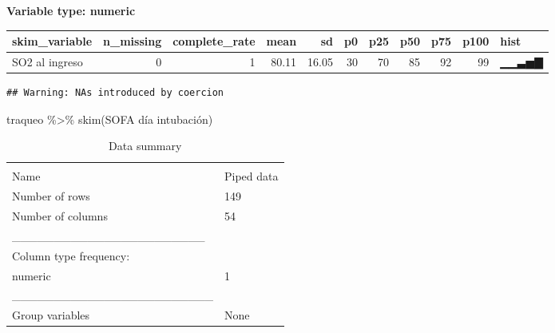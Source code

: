 \documentclass[
]{article}
\newenvironment{Shaded}{\begin{snugshade}}{\end{snugshade}}
\newcommand{\AttributeTok}[1]{\textcolor[rgb]{0.77,0.63,0.00}{#1}}
\newcommand{\DocumentationTok}[1]{\textcolor[rgb]{0.56,0.35,0.01}{\textbf{\textit{#1}}}}
\newcommand{\FunctionTok}[1]{\textcolor[rgb]{0.00,0.00,0.00}{#1}}
\newcommand{\NormalTok}[1]{#1}
\newcommand{\OtherTok}[1]{\textcolor[rgb]{0.56,0.35,0.01}{#1}}
\newcommand{\SpecialCharTok}[1]{\textcolor[rgb]{0.00,0.00,0.00}{#1}}
\newcommand{\StringTok}[1]{\textcolor[rgb]{0.31,0.60,0.02}{#1}}
\begin{document}
\textbf{Variable type: numeric}

\begin{longtable}[]{@{}lrrrrrrrrrl@{}}
\toprule
skim\_variable & n\_missing & complete\_rate & mean & sd & p0 & p25 &
p50 & p75 & p100 & hist \\
\midrule
\endhead
SO2 al ingreso & 0 & 1 & 80.11 & 16.05 & 30 & 70 & 85 & 92 & 99 &
▁▁▃▅▇ \\
\bottomrule
\end{longtable}

\begin{Shaded}
\end{Shaded}

\begin{verbatim}
## Warning: NAs introduced by coercion
\end{verbatim}

\begin{Shaded}
\begin{Highlighting}[]
\NormalTok{traqueo }\SpecialCharTok{\%\textgreater{}\%}
  \FunctionTok{skim}\NormalTok{(}\StringTok{\textasciigrave{}}\AttributeTok{SOFA día intubación}\StringTok{\textasciigrave{}}\NormalTok{)}
\end{Highlighting}
\end{Shaded}

\begin{longtable}[]{@{}ll@{}}
\caption{Data summary}\tabularnewline
\toprule
& \\
\midrule
\endfirsthead
\toprule
& \\
\midrule
\endhead
Name & Piped data \\
Number of rows & 149 \\
Number of columns & 54 \\
\_\_\_\_\_\_\_\_\_\_\_\_\_\_\_\_\_\_\_\_\_\_\_ & \\
Column type frequency: & \\
numeric & 1 \\
\_\_\_\_\_\_\_\_\_\_\_\_\_\_\_\_\_\_\_\_\_\_\_\_ & \\
Group variables & None \\
\bottomrule
\end{longtable}
\end{document}
